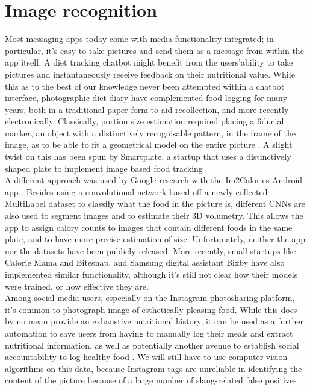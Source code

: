 \section{Image recognition}
Most messaging apps today come with media functionality integrated; in particular, it's easy to take pictures and send them as a message from within the app itself. A diet tracking chatbot might benefit from the users'ability to take pictures and instantaneously receive feedback on their nutritional value. While this as to the best of our knowledge never been attempted within a chatbot interface, photographic diet diary have complemented food logging for many years, both in a traditional paper form to aid recollection\cite{}, and more recently electronically. Classically, portion size estimation required placing a fiducial marker, an object with a distinctively recognisable pattern, in the frame of the image, as to be able to fit a geometrical model on the entire picture \cite{Ahmad2016}. A slight twist on this has been spun by Smartplate, a startup that uses a distinctively shaped plate to implement image based food tracking \cite{} \\
A different approach was used by Google research with the Im2Calories Android app \cite{Myers2015}. Besides using a convolutional network based off a newly collected MultiLabel dataset to classify what the food in the picture is, different CNNs are also used to segment images and to estimate their 3D volumetry. This allows the app to assign calory counts to images that contain different foods in the same plate, and to have more precise estimation of size. Unfortunately, neither the app nor the datasets have been publicly released. More recently, small startups like Calorie Mama\cite{caloriemamaai} and Bitesnap\cite{bitesnap}, and Samsung digital assistant Bixby\cite{bixbyarticle} have also implemented similar functionality, although it's still not clear how their models were trained, or how effective they are. \\
Among social media users, especially on the Instagram photosharing platform, it's common to photograph image of esthetically pleasing food. While this does by no mean provide an exhaustive nutritional history, it can be used as a further automation to save users from having to manually log their meals and extract nutritional information, as well as potentially another avenue to establish social accountability to log healthy food \cite{Sharma:2015:MCN:2740908.2742754}. We will still have to use computer vision algorithms on this data, because Instagram tags are unreliable in identifying the content of the picture because of a large number of slang-related false positives \cite{hospedales2016}

